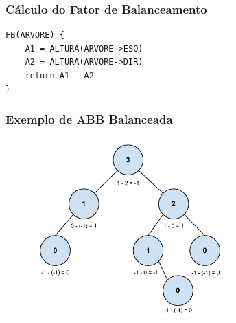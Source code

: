 \begin{frame}[fragile]
\frametitle{Cálculo do Fator de Balanceamento}
\begin{verbatim}
FB(ARVORE) {
    A1 = ALTURA(ARVORE->ESQ)
    A2 = ALTURA(ARVORE->DIR)
    return A1 - A2 
}
\end{verbatim}
\end{frame}


\begin{frame}
    \frametitle{Exemplo de ABB Balanceada}
    
    \begin{figure}[tbp]
    \includegraphics[keepaspectratio=true,width=3in]{figs/fig_arvores/Balanceamento_Arvore}
    \centering
    \end{figure}
\end{frame}

